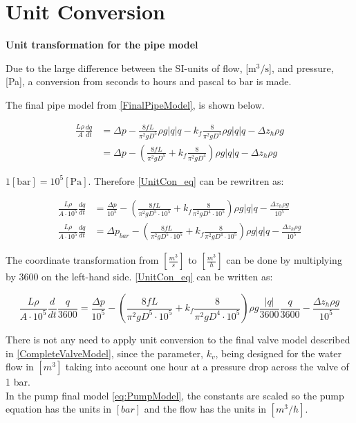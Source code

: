 \chapter{Unit Conversion}
\label{unitCON}
\textbf{Unit transformation for the pipe model}

Due to the large difference between the SI-units of flow, [$\text{m}^3/\text{s}$], and pressure, [Pa], a conversion from seconds to hours and pascal to bar is made.

The final pipe model from \eqref{FinalPipeModel}, is shown below.   

\begin{equation}
\begin{split}
   \frac{L \rho}{A} \frac{dq}{dt} &=\Delta p - \frac{8fL}{\pi^{2}gD^5} \rho g  |q| q - k_f \frac{8}{\pi^2gD^4} \rho g |q| q - \Delta z_h \rho g \\
   &=\Delta p - (\frac{8fL}{\pi^{2}gD^5} + k_f \frac{8}{\pi^2gD^4}) \rho g |q| q - \Delta z_h \rho g
\end{split}
\label{UnitCon_eq}
\end{equation}

$1 [\text{bar}] = 10^5[\text{Pa}]$. Therefore \eqref{UnitCon_eq} can be rewritren as: 

\begin{equation}
\begin{split}
   \frac{L \rho}{A\cdot10^5} \frac{dq}{dt} &=  \frac{\Delta p}{10^5} - (\frac{8fL}{\pi^{2}gD^5\cdot10^5} + k_f \frac{8}{\pi^2gD^4\cdot10^5}) \rho g |q| q - \frac{\Delta z_h \rho g}{10^5}\\
   \frac{L \rho}{A\cdot10^5} \frac{dq}{dt} &= \Delta p_{bar} - (\frac{8fL}{\pi^{2}gD^5\cdot10^5} + k_f \frac{8}{\pi^2gD^4\cdot10^5}) \rho g |q| q - \frac{\Delta z_h \rho g}{10^5}
\end{split}
\end{equation}

The coordinate transformation from $[\frac{m^3}{s}]$ to $[\frac{m^3}{h}]$ can be done by multiplying by 3600 on the left-hand side. \eqref{UnitCon_eq} can be written as:

\begin{equation}
   \frac{L \rho}{A\cdot10^5} \frac{d}{dt}\frac{q}{3600} = \frac{\Delta p}{10^5} - (\frac{8fL}{\pi^{2}gD^5\cdot10^5} + k_f \frac{8}{\pi^2gD^4\cdot10^5}) \rho g \frac{|q|}{3600} \frac{q}{3600} - \frac{\Delta z_h \rho g}{10^5}
\end{equation}

There is not any need to apply unit conversion to the final valve model described in \eqref{CompleteValveModel}, since the parameter, $k_v$, being designed for the water flow in $[m^3]$ taking into account one hour at a pressure drop across the valve of 1 bar. 
\\
In the pump final model \eqref{eq:PumpModel}, the constants are scaled so the pump equation has the units in $[bar]$ and the flow has the units in $[m^3/h]$.

